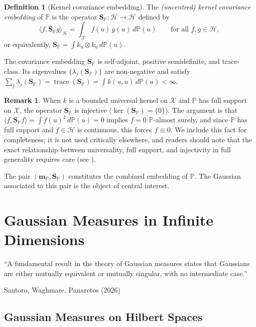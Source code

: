 \documentclass[12pt, oneside]{book}
\theoremstyle{plain}
\theoremstyle{definition}
\newtheorem{definition}[theorem]{Definition}
\newtheorem{remark}[theorem]{Remark}
\newcommand{\calH}{\mathcal{H}}
\newcommand{\calX}{\mathcal{X}}
\newcommand{\PP}{\mathbb{P}}
\newcommand{\mP}{\mathbf{m}_{\PP}}
\newcommand{\SP}{\mathbf{S}_{\PP}}
\DeclareMathOperator{\trace}{trace}
\begin{document}
\begin{definition}[Kernel covariance embedding]
The \emph{(uncentred) kernel covariance embedding} of $\PP$ is the operator $\SP: \calH \to \calH$ defined by
\begin{equation}
\langle f, \SP g \rangle_{\calH} = \int_{\calX} f(u)\, g(u)\, d\PP(u) \qquad \text{for all } f, g \in \calH,
\end{equation}
or equivalently, $\SP = \int k_u \otimes k_u\, d\PP(u)$.
\end{definition}

The covariance embedding $\SP$ is self-adjoint, positive semidefinite, and trace-class. Its eigenvalues $\{\lambda_j(\SP)\}$ are non-negative and satisfy $\sum_j \lambda_j(\SP) = \trace(\SP) = \int k(u, u)\, d\PP(u) < \infty$.

\begin{remark}
When $k$ is a bounded universal kernel on $\calX$ and $\PP$ has full support on $\calX$, the operator $\SP$ is injective ($\ker(\SP) = \{0\}$). The argument is that $\langle f, \SP f \rangle = \int f(u)^2\, d\PP(u) = 0$ implies $f = 0$ $\PP$-almost surely, and since $\PP$ has full support and $f \in \calH$ is continuous, this forces $f \equiv 0$. We include this fact for completeness; it is not used critically elsewhere, and readers should note that the exact relationship between universality, full support, and injectivity in full generality requires care (see \cite{SteinwartChristmann2008}).
\end{remark}

The pair $(\mP, \SP)$ constitutes the combined embedding of $\PP$. The Gaussian associated to this pair is the object of central interest.

\chapter{Gaussian Measures in Infinite Dimensions}
\label{chap:gaussian}

\epigraph{``A fundamental result in the theory of Gaussian measures states that
Gaussians are either mutually equivalent or mutually singular, with no
intermediate case.''}{Santoro, Waghmare, Panaretos (2026)}

\section{Gaussian Measures on Hilbert Spaces}
\end{document}
